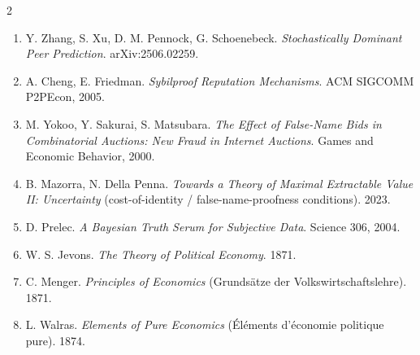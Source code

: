 \documentclass[10pt]{article}
\begin{document}
\begin{multicols}{2}
\begin{enumerate}[leftmargin=1.4em,itemsep=0pt]
\item Y. Zhang, S. Xu, D. M. Pennock, G. Schoenebeck. \emph{Stochastically Dominant Peer Prediction}. arXiv:2506.02259.
\item A. Cheng, E. Friedman. \emph{Sybilproof Reputation Mechanisms}. ACM SIGCOMM P2PEcon, 2005.
\item M. Yokoo, Y. Sakurai, S. Matsubara. \emph{The Effect of False-Name Bids in Combinatorial Auctions: New Fraud in Internet Auctions}. Games and Economic Behavior, 2000.
\item B. Mazorra, N. Della Penna. \emph{Towards a Theory of Maximal Extractable Value II: Uncertainty} (cost-of-identity / false-name-proofness conditions). 2023.
\item D. Prelec. \emph{A Bayesian Truth Serum for Subjective Data}. Science 306, 2004.
\item W. S. Jevons. \emph{The Theory of Political Economy}. 1871.
\item C. Menger. \emph{Principles of Economics} (Grunds\"atze der Volkswirtschaftslehre). 1871.
\item L. Walras. \emph{Elements of Pure Economics} (\'El\'ements d'\'economie politique pure). 1874.
\end{enumerate}
\end{multicols}
\end{document}
